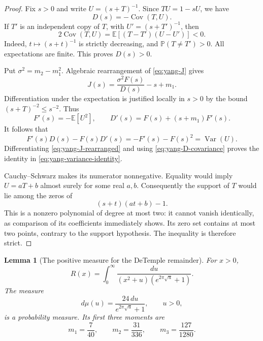 \documentclass[11pt,a4paper]{article}
\newtheorem{lemma}[theorem]{Lemma}
\theoremstyle{definition}
\theoremstyle{remark}
\newcommand{\E}{\mathbb E}
\DeclareMathOperator{\Var}{Var}
\DeclareMathOperator{\Cov}{Cov}
\numberwithin{equation}{section}
\begin{document}
\begin{proof}
Fix $s>0$ and write $U=(s+T)^{-1}$. Since
$TU=1-sU$, we have
\begin{equation}\label{eq:yang-D-covariance}
 D(s)=-\Cov(T,U).
\end{equation}
If $T'$ is an independent copy of $T$, with $U'=(s+T')^{-1}$, then
\[
 2\Cov(T,U)=\E[(T-T')(U-U')]<0.
\]
Indeed, $t\mapsto(s+t)^{-1}$ is strictly decreasing, and
$\mathbb P(T\ne T')>0$. All expectations are finite. This proves
$D(s)>0$.

Put $\sigma^2=m_2-m_1^2$. Algebraic rearrangement of
\eqref{eq:yang-J} gives
\begin{equation}\label{eq:yang-J-rearranged}
 J(s)=\frac{\sigma^2F(s)}{D(s)}-s+m_1.
\end{equation}
Differentiation under the expectation is justified locally in $s>0$
by the bound $(s+T)^{-2}\le s^{-2}$. Thus
\[
 F'(s)=-\E[U^2],\qquad
 D'(s)=F(s)+(s+m_1)F'(s).
\]
It follows that
\[
 F'(s)D(s)-F(s)D'(s)
 =-F'(s)-F(s)^2
 =\Var(U).
\]
Differentiating \eqref{eq:yang-J-rearranged} and using
\eqref{eq:yang-D-covariance} proves the identity in
\eqref{eq:yang-variance-identity}.

Cauchy--Schwarz makes its numerator nonnegative. Equality would imply
$U=aT+b$ almost surely for some real $a,b$. Consequently the support of
$T$ would lie among the zeros of
\[
 (s+t)(at+b)-1.
\]
This is a nonzero polynomial of degree at most two: it cannot vanish
identically, as comparison of its coefficients immediately shows. Its
zero set contains at most two points, contrary to the support hypothesis.
The inequality is therefore strict.
\end{proof}

\begin{lemma}[The positive measure for the DeTemple remainder]
\label{lem:yang-measure}
For $x>0$,
\begin{equation}\label{eq:yang-stieltjes}
 R(x)=\int_0^\infty
 \frac{du}{(x^2+u)(e^{2\pi\sqrt{u}}+1)}.
\end{equation}
The measure
\begin{equation}\label{eq:yang-probability}
 d\mu(u)=\frac{24\,du}{e^{2\pi\sqrt{u}}+1},\qquad u>0,
\end{equation}
is a probability measure. Its first three moments are
\begin{equation}\label{eq:yang-moments}
 m_1=\frac7{40},\qquad m_2=\frac{31}{336},\qquad
 m_3=\frac{127}{1280}.
\end{equation}
\end{lemma}
\end{document}
